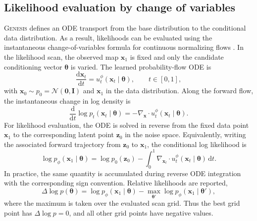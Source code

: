 \documentclass{article}
\newcommand{\thetavec}{\boldsymbol{\theta}}
\begin{document}
\subsection{Likelihood evaluation by change of variables}
\label{sec:likelihood_change}

\textsc{Genesis} defines an ODE transport from the base distribution to
the conditional data distribution. As a result, likelihoods can be
evaluated using the instantaneous change-of-variables formula for
continuous normalizing flows \citep{Chen2018}. In the likelihood scan,
the observed map $\mathbf{x}_1$ is fixed and only the candidate
conditioning vector $\thetavec$ is varied. The learned probability-flow
ODE is
\begin{equation}
  \frac{\mathrm{d}\mathbf{x}_t}{\mathrm{d}t}
  =
  u_t^\phi(\mathbf{x}_t\mid\thetavec),
  \qquad t\in[0,1],
  \label{eq:likelihood_pfode}
\end{equation}
with $\mathbf{x}_0\sim p_0=\mathcal{N}(\mathbf{0},\mathbf{I})$ and
$\mathbf{x}_1$ in the data distribution. Along the forward flow, the
instantaneous change in log density is
\begin{equation}
  \frac{\mathrm{d}}{\mathrm{d}t}
  \log p_t(\mathbf{x}_t\mid\thetavec)
  =
  -
  \nabla_{\mathbf{x}}\!\cdot
  u_t^\phi(\mathbf{x}_t\mid\thetavec).
  \label{eq:instantaneous_change}
\end{equation}
For likelihood evaluation, the ODE is solved in reverse from the fixed
data point $\mathbf{x}_1$ to the corresponding latent point
$\mathbf{z}_0$ in the noise space. Equivalently, writing the associated
forward trajectory from $\mathbf{z}_0$ to $\mathbf{x}_1$, the conditional
log likelihood is
\begin{equation}
  \log p_\phi(\mathbf{x}_1\mid\thetavec)
  =
  \log p_0(\mathbf{z}_0)
  -
  \int_0^1
  \nabla_{\mathbf{x}_t}\!\cdot
  u_t^\phi(\mathbf{x}_t\mid\thetavec)
  \,\mathrm{d}t .
  \label{eq:cnf_likelihood}
\end{equation}
In practice, the same quantity is accumulated during reverse ODE
integration with the corresponding sign convention.
Relative likelihoods are reported,
\begin{equation}
  \Delta\log p(\thetavec)
  =
  \log p_\phi(\mathbf{x}_1\mid\thetavec)
  -
  \max_{\thetavec'}
  \log p_\phi(\mathbf{x}_1\mid\thetavec'),
  \label{eq:dlogp_scan}
\end{equation}
where the maximum is taken over the evaluated scan grid. Thus the
best grid point has $\Delta\log p=0$, and all other grid points have
negative values.
\end{document}
